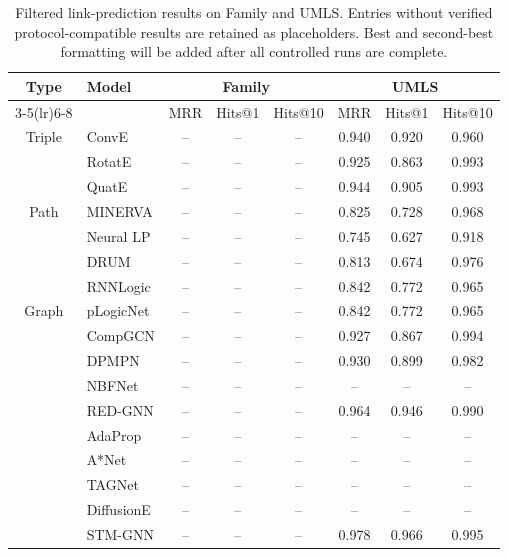 \documentclass[a4paper,fleqn]{cas-sc}
\begin{document}
\begin{table}[t]
\caption{Filtered link-prediction results on Family and UMLS. Entries without
verified protocol-compatible results are retained as placeholders. Best and
second-best formatting will be added after all controlled runs are complete.}
\label{tab:main_results_small}
\centering
\scriptsize
\setlength{\tabcolsep}{3.0pt}
\renewcommand{\arraystretch}{1.08}
\begin{tabular}{clcccccc}
\toprule
\multirow{2}{*}{Type} & \multirow{2}{*}{Model} & \multicolumn{3}{c}{Family} & \multicolumn{3}{c}{UMLS} \\
\cmidrule(lr){3-5}\cmidrule(lr){6-8}
 & & MRR & Hits@1 & Hits@10 & MRR & Hits@1 & Hits@10 \\
\midrule
Triple & ConvE & -- & -- & -- & 0.940 & 0.920 & 0.960 \\
 & RotatE & -- & -- & -- & 0.925 & 0.863 & 0.993 \\
 & QuatE & -- & -- & -- & 0.944 & 0.905 & 0.993 \\
\midrule
Path & MINERVA & -- & -- & -- & 0.825 & 0.728 & 0.968 \\
 & Neural LP & -- & -- & -- & 0.745 & 0.627 & 0.918 \\
 & DRUM & -- & -- & -- & 0.813 & 0.674 & 0.976 \\
 & RNNLogic & -- & -- & -- & 0.842 & 0.772 & 0.965 \\
\midrule
Graph & pLogicNet & -- & -- & -- & 0.842 & 0.772 & 0.965 \\
 & CompGCN & -- & -- & -- & 0.927 & 0.867 & 0.994 \\
 & DPMPN & -- & -- & -- & 0.930 & 0.899 & 0.982 \\
 & NBFNet & -- & -- & -- & -- & -- & -- \\
 & RED-GNN & -- & -- & -- & 0.964 & 0.946 & 0.990 \\
 & AdaProp & -- & -- & -- & -- & -- & -- \\
 & A*Net & -- & -- & -- & -- & -- & -- \\
 & TAGNet & -- & -- & -- & -- & -- & -- \\
 & DiffusionE & -- & -- & -- & -- & -- & -- \\
\midrule
 & STM-GNN & -- & -- & -- & 0.978 & 0.966 & 0.995 \\
\bottomrule
\end{tabular}
\end{table}
\end{document}
